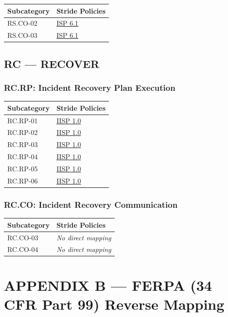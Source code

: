 \documentclass[11pt,landscape]{article}
\begin{document}
\begin{tabularx}{\textwidth}{|p{3.5cm}|X|}
\hline
\rowcolor{headgray} \textbf{Subcategory} & \textbf{Stride Policies} \\
\hline
RS.CO-02 & \hyperref[pol:ISP61]{ISP 6.1} \\
\hline
RS.CO-03 & \hyperref[pol:ISP61]{ISP 6.1} \\
\hline
\end{tabularx}

\subsection{RC --- RECOVER}

\subsubsection{RC.RP: Incident Recovery Plan Execution}

\begin{tabularx}{\textwidth}{|p{3.5cm}|X|}
\hline
\rowcolor{headgray} \textbf{Subcategory} & \textbf{Stride Policies} \\
\hline
RC.RP-01 & \hyperref[pol:IISP10]{IISP 1.0} \\
\hline
RC.RP-02 & \hyperref[pol:IISP10]{IISP 1.0} \\
\hline
RC.RP-03 & \hyperref[pol:IISP10]{IISP 1.0} \\
\hline
RC.RP-04 & \hyperref[pol:IISP10]{IISP 1.0} \\
\hline
RC.RP-05 & \hyperref[pol:IISP10]{IISP 1.0} \\
\hline
RC.RP-06 & \hyperref[pol:IISP10]{IISP 1.0} \\
\hline
\end{tabularx}

\subsubsection{RC.CO: Incident Recovery Communication}

\begin{tabularx}{\textwidth}{|p{3.5cm}|X|}
\hline
\rowcolor{headgray} \textbf{Subcategory} & \textbf{Stride Policies} \\
\hline
RC.CO-03 & \textit{No direct mapping} \\
\hline
RC.CO-04 & \textit{No direct mapping} \\
\hline
\end{tabularx}


\section{APPENDIX B --- FERPA (34 CFR Part 99) Reverse Mapping}
\label{app:ferpa}
\end{document}
